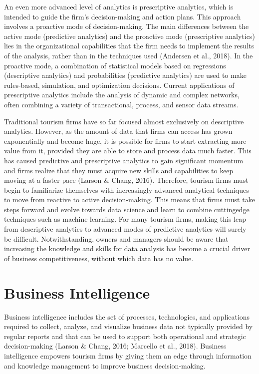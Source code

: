 \documentclass[
  letterpaper,
  DIV=11,
  numbers=noendperiod]{scrreprt}
\begin{document}
An even more advanced level of analytics is prescriptive analytics,
which is intended to guide the firm's decision-making and action plans.
This approach involves a proactive mode of decision-making. The main
differences between the active mode (predictive analytics) and the
proactive mode (prescriptive analytics) lies in the organizational
capabilities that the firm needs to implement the results of the
analysis, rather than in the techniques used (Andersen et al., 2018). In
the proactive mode, a combination of statistical models based on
regressions (descriptive analytics) and probabilities (predictive
analytics) are used to make rules-based, simulation, and optimization
decisions. Current applications of prescriptive analytics include the
analysis of dynamic and complex networks, often combining a variety of
transactional, process, and sensor data streams.

Traditional tourism firms have so far focused almost exclusively on
descriptive analytics. However, as the amount of data that firms can
access has grown exponentially and become huge, it is possible for firms
to start extracting more value from it, provided they are able to store
and process data much faster. This has caused predictive and
prescriptive analytics to gain significant momentum and firms realize
that they must acquire new skills and capabilities to keep moving at a
faster pace (Larson \& Chang, 2016). Therefore, tourism firms must begin
to familiarize themselves with increasingly advanced analytical
techniques to move from reactive to active decision-making. This means
that firms must take steps forward and evolve towards data science and
learn to combine cuttingedge techniques such as machine learning. For
many tourism firms, making this leap from descriptive analytics to
advanced modes of predictive analytics will surely be difficult.
Notwithstanding, owners and managers should be aware that increasing the
knowledge and skills for data analysis has become a crucial driver of
business competitiveness, without which data has no value.

\hypertarget{business-intelligence}{%
\section{Business Intelligence}\label{business-intelligence}}

Business intelligence includes the set of processes, technologies, and
applications required to collect, analyze, and visualize business data
not typically provided by regular reports and that can be used to
support both operational and strategic decision-making (Larson \& Chang,
2016; Marcello et al., 2018). Business intelligence empowers tourism
firms by giving them an edge through information and knowledge
management to improve business decision-making.
\end{document}
